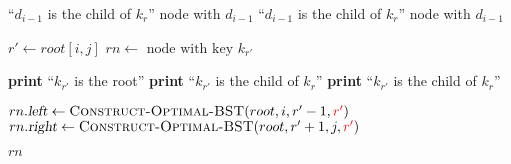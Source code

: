 
\begin{algorithm}[H]
  \begin{algorithmic}[1]
    	
	 ``$d_{i-1}$ is the  child of $k_{r}$'' \quad \Return node with $d_{i-1}$
      \EndIf
	 ``$d_{i-1}$ is the  child of $k_{r}$'' \quad \Return node with $d_{i-1}$
      \EndIf

      \hStatex
      \State $r' \gets root[i,j]$ \qquad $rn \gets \text{ node with key } k_{r'}$

      \hStatex
	\State \textbf{print} ``$k_{r'}$ is the root''
        \State \textbf{print} ``$k_{r'}$ is the  child of $k_{r}$''
        \State \textbf{print} ``$k_{r'}$ is the  child of $k_{r}$''
      \EndIf

      \hStatex
      \State $rn.\textsl{left} \gets \Call{Construct-Optimal-BST}{root, i, r'-1, \red{r'}}$
      \State $rn.\textsl{right} \gets \Call{Construct-Optimal-BST}{root, r'+1, j, \red{r'}}$

      \hStatex
      \State \Return $rn$
    \EndProcedure
  \end{algorithmic}
\end{algorithm}
